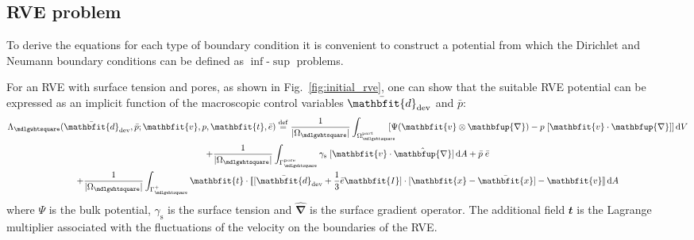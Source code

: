 \documentclass[notitlepage,a4paper,fleqn,9pt]{extarticle}
\renewcommand{\ta}[1]{\mathbfit{#1}}
\renewcommand{\ts}[1]{\mathbfit{#1}}
\renewcommand{\diff}{\mathbfup{\nabla}}
\renewcommand{\Box}{\mdlgwhtsquare}
\newcommand{\volume}{\frac{1}{|\Omega_\Box|}}
\newcommand{\jump}[1]{[\![#1]\!]}
\newcommand{\pore}{\mathrm{pore}}
\newcommand{\particle}{\mathrm{part}}
\newcommand{\surf}{\mathrm{s}}
\newcommand{\figref}[1]{Fig.~\ref{#1}}
\begin{document}
\begin{multicols}{2}
\section{RVE problem}
To derive the equations for each type of boundary condition it is convenient to construct a potential from which the Dirichlet and Neumann boundary conditions can be defined as $\inf$-$\sup$ problems.

For an RVE with surface tension and pores, as shown in \figref{fig:initial_rve}, one can show that the suitable RVE potential can be expressed as an implicit function of the macroscopic control variables $\bar{\ts d}_\dev$ and $\bar{p}$:
\begin{multline}
 \Lambda_\Box(\bar{\ts d}_\dev, \bar{p}; \ta v, p, \ta t, \bar{e}) \defeq
     \volume\int_{\Omega_\Box^\particle} \!\!\!\!\![\Psi(\ta v\outerp\diff) - p\;[\ta v\cdot\diff]] \dif V
\\
   + \volume\int_{\Gamma_\Box^\pore} \gamma_\surf \;[\ta v \cdot \hat{\diff}]\dif A
  + \bar{p}\; \bar{e}
\\
  + \volume \int_{\Gamma_\Box^+} \ta t \cdot \jump{[\bar{\ts d}_\dev + \frac13\bar{e}\ts I]\cdot[\ta x - \bar{\ta x}] - \ta v}\dif A
\label{eq:rve_potential}
\end{multline}
where $\Psi$ is the bulk potential, $\gamma_\surf$ is the surface tension and $\hat{\diff}$ is the surface gradient operator.
The additional field $\ta t$ is the Lagrange multiplier associated with the fluctuations of the velocity on the boundaries of the RVE.


\end{multicols}
\end{document}

